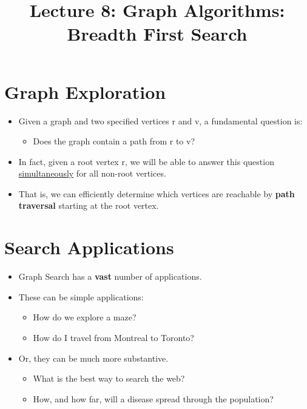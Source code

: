 \documentclass[12pt]{article}
\title{\huge Lecture 8: Graph Algorithms: Breadth First Search}
\author{}
\date{}
\begin{document}
\maketitle


\section{Graph Exploration}
\renewcommand{\labelitemii}{$\circ$}
\renewcommand{\labelitemiii}{$\cdot$}
\renewcommand{\labelitemiii}{$\rightarrow$}
\renewcommand{\labelitemiv}{$\star$}
\begin{itemize}
\item Given a graph and two specified vertices r and v, a fundamental question is:
	\begin{itemize}
	\item Does the graph contain a path from r to v?
	\end{itemize}
\item In fact, given a root vertex r, we will be able to answer this question \underline{simultaneously} for all non-root vertices.
\item That is, we can efficiently determine which vertices are reachable by \textbf{path traversal} starting at the root vertex.
\end{itemize}

\section{Search Applications}
\renewcommand{\labelitemii}{$\circ$}
\renewcommand{\labelitemiii}{$\cdot$}
\renewcommand{\labelitemiii}{$\rightarrow$}
\renewcommand{\labelitemiv}{$\star$}
\begin{itemize}
\item Graph Search has a \textbf{vast} number of applications.
\item These can be simple applications:
	\begin{itemize}
	\item How do we explore a maze?
	\item How do I travel from Montreal to Toronto?
	\end{itemize}
\item Or, they can be much more substantive.
	\begin{itemize}
	\item What is the best way to search the web?
	\item How, and how far, will a disease spread through the population?
	\end{itemize}
\end{itemize}
\end{document}

